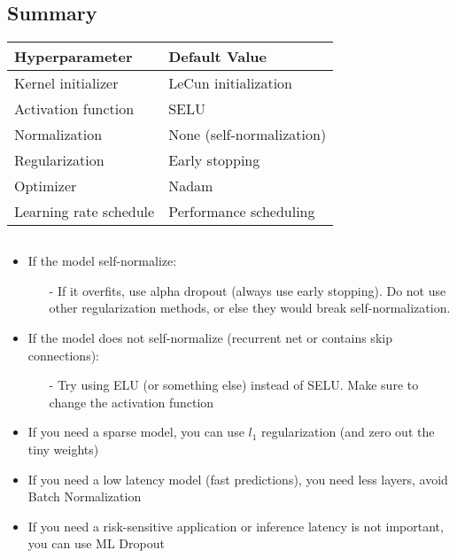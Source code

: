 \documentclass[french]{article}
\begin{document}
\subsection{Summary}

\begin{tabular}{@{}ll@{}}
    \toprule
    Hyperparameter & Default Value \\
    \hline
    Kernel initializer & LeCun initialization \\
    Activation function & SELU \\
    Normalization & None (self-normalization) \\
    Regularization & Early stopping \\
    Optimizer & Nadam \\
    Learning rate schedule & Performance scheduling \\
    \bottomrule
\end{tabular}
$ $ \\

\begin{itemize}
    \item If the model self-normalize:
        \begin{itemize}
            \item[-] If it overfits, use alpha dropout (always use early stopping). Do not use other regularization methods, or else they would break self-normalization.
        \end{itemize}
    \item If the model does not self-normalize (recurrent net or contains skip connections):
        \begin{itemize}
            \item[-] Try using ELU (or something else) instead of SELU. Make sure to change the activation function
        \end{itemize}
    \item If you need a sparse model, you can use $l_1$ regularization (and zero out the tiny weights)
    \item If you need a low latency model (fast predictions), you need less layers, avoid Batch Normalization
    \item If you need a risk-sensitive application or inference latency is not important, you can use ML Dropout
\end{itemize}
\end{document}
